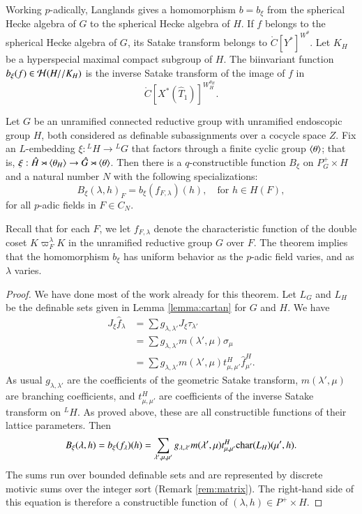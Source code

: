 Working $p$-adically, Langlands gives a homomorphism
$b = b_\xi$ from the spherical Hecke algebra of $G$ to the spherical
Hecke algebra of $H$.  If $f$ belongs to the spherical Hecke algebra
of $G$, its Satake transform belongs to $\ring{C}[Y^*]^{W^\theta}$.
Let $K_H$ be a hyperspecial maximal compact subgroup of $H$.
The biinvariant function $b_\xi(f)\in\mathcal H(H//K_H)$ is the inverse
Satake transform of the image of $f$ in
\[
\ring{C}[X^*(\hat T_1)]^{W_H^{\theta_H}}.
\]

\begin{theorem}\label{thm:B}
  Let $G$ be an unramified connected reductive group with unramified
  endoscopic group $H$, both considered as definable subassignments
  over a cocycle space $Z$.  Fix an $L$-embedding $\xi:{}^LH\to {}^LG$
  that factors through a finite cyclic group $\langle{\theta}\rangle$; that is,
  $\xi:\hat H\rtimes \langle{\theta_H}\rangle \to \hat G \rtimes \langle{\theta}\rangle$.
  Then there is a $q$-constructible function $B_\xi$ on $P^+_G\times H$
  and a natural number $N$ with the following specializations:
\[
B_\xi(\lambda,h)_F = b_\xi(f_{F,\lambda})(h),\quad \text{for } h\in H(F),
\]
for all $p$-adic fields in $F\in C_N$.  
\end{theorem}

Recall that for each $F$, we let $f_{F,\lambda}$ denote the
characteristic function of the double coset $K\varpi_F^\lambda K$ in
the unramified reductive group $G$ over $F$.  The theorem implies that
the homomorphism $b_\xi$ has uniform behavior as the $p$-adic field
varies, and as $\lambda$ varies.

\begin{proof}
  We have done most of the work already for this theorem.  Let $L_G$
  and $L_H$ be the definable sets given in Lemma \ref{lemma:cartan}
  for $G$ and $H$.  
   We have
  \begin{align*}
    J_\xi \hat f_\lambda  &= 
\sum  g_{\lambda,\lambda'} J_\xi\tau_{\lambda'}
\\ &=
\sum g_{\lambda,\lambda'} m(\lambda',\mu) \sigma_\mu 
\\ &=
\sum g_{\lambda,\lambda'} m(\lambda',\mu) t^H_{\mu,\mu'} \hat f_{\mu'}^H.           
    \end{align*}
As usual $g_{\lambda,\lambda'}$ are the coefficients of the geometric
Satake
transform, $m(\lambda',\mu)$ are branching coefficients, and
$t^H_{\mu,\mu'}$ are coefficients of the inverse Satake transform on
${}^LH$.  As proved above, these are all constructible functions of
their
lattice parameters.
Then
\[
B_\xi(\lambda,h) = b_\xi(f_\lambda)(h) =
\sum_{\lambda',\mu,\mu'} g_{\lambda,\lambda'} m(\lambda',\mu)
t^H_{\mu,\mu'}
{\operatorname{char}}(L_H)(\mu',h).
\]
The sums run over bounded definable sets and are represented by
discrete motivic sums over the integer sort (Remark \ref{rem:matrix}).  
The right-hand side of
this
equation is therefore a constructible function of $(\lambda,h)\in
P^+\times H$.
\end{proof}

